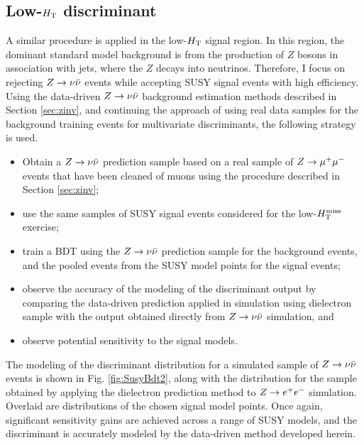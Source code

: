 \subsection{Low-$H_{\rm T}$ discriminant}
\label{sec:chosentarget}
A similar procedure is applied in the low-$H_{\rm T}$ signal region. In this region, the dominant standard model background is from the production of $Z$ bosons in association with jets, where the $Z$ decays into neutrinos. Therefore, I focus on rejecting $Z\rightarrow \nu\bar{\nu}$ events while accepting SUSY signal events with high efficiency. Using the data-driven $Z\rightarrow \nu\bar{\nu}$ background estimation methods described in Section \ref{sec:zinv}, and continuing the approach of using real data samples for the background training events for multivariate discriminants, the following strategy is used.
\begin{itemize}
\item Obtain a $Z\rightarrow \nu\bar{\nu}$ prediction sample based on a real sample of $Z\rightarrow \mu^+\mu^-$ events that have been cleaned of muons using the procedure described in Section \ref{sec:zinv};
\item use the same samples of SUSY signal events considered for the low-$H_{\text{T}}^{\rm miss}$ exercise;
\item train a BDT using the $Z\rightarrow \nu\bar{\nu}$ prediction sample for the background events, and the pooled events from the SUSY model points for the signal events;
\item observe the accuracy of the modeling of the discriminant output by comparing the data-driven prediction applied in simulation using dielectron sample with the output obtained directly from $Z\rightarrow \nu\bar{\nu}$ simulation, and
\item observe potential sensitivity to the signal models.
\end{itemize}
The modeling of the discriminant distribution for a simulated sample of $Z\rightarrow \nu\bar{\nu}$ events is shown in Fig. \ref{fig:SusyBdt2}, along with the distribution for the sample obtained by applying the dielectron prediction method to $Z\rightarrow e^+e^-$ simulation. Overlaid are distributions of the chosen signal model points. Once again, significant sensitivity gains are achieved across a range of SUSY models, and the discriminant is accurately modeled by the data-driven method developed herein. 
